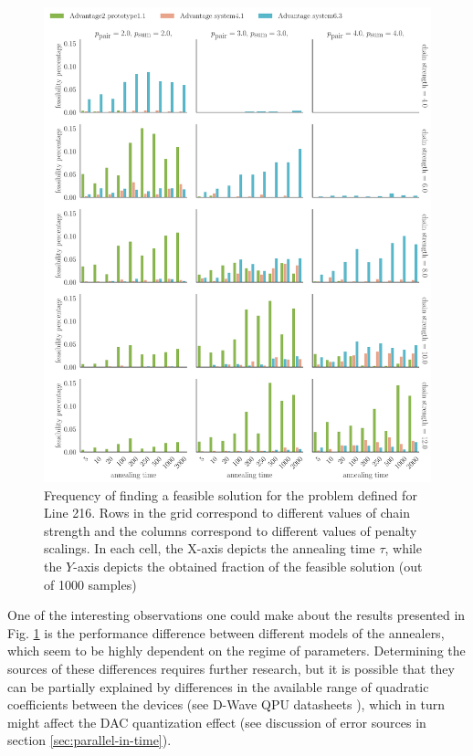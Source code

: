 \begin{figure}
  \includegraphics[width=\textwidth]{figures/dwave_line_216_result.pdf}
  \caption{
    Frequency of finding a feasible solution for the problem defined for Line 216.
    Rows in the grid correspond to different values of chain strength and the
    columns correspond to different values of penalty scalings. In each cell, the
    X-axis depicts the annealing time $\tau$, while the $Y$-axis depicts the
    obtained fraction of the feasible solution (out of 1000 samples) }
  \label{fig:dwline216freq}
\end{figure}

One of the interesting observations one could make about the results presented
in Fig. \ref{fig:dwline216freq} is the performance difference between different
models of the annealers, which seem to be highly dependent on the regime of
parameters. Determining the sources of these differences requires further
research, but it is possible that they can be partially explained by
differences in the available range of quadratic coefficients between the
devices (see D-Wave QPU datasheets \cite{dwavedocs}), which in turn might
affect the DAC quantization effect (see discussion of error sources in section
\ref{sec:parallel-in-time}).

